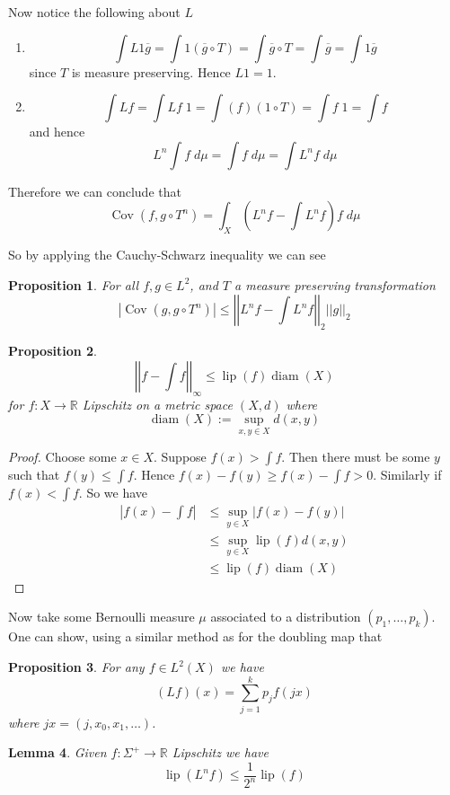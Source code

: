 \documentclass[11pt]{article}
\newcommand{\defeq}{:=}
\newcommand{\abs}[1]{\left|#1\right|}
\newcommand{\norm}[1]{\left|\left|#1\right|\right|}
\newcommand{\R}{\mathbb{R}}
\DeclareMathOperator{\Cov}{\mathrm{Cov}}
\DeclareMathOperator{\lip}{\mathrm{lip}}
\DeclareMathOperator{\diam}{\mathrm{diam}}
\newcommand{\dm}{\;d\mu}
\newtheorem{prop}{Proposition}[section]
\newtheorem{lemma}[prop]{Lemma}
\begin{document}
Now notice the following about $L$
\begin{enumerate}
	\item \[
			\int L 1 \overline{g} = \int 1 \left( \overline{g}\circ T\right) = \int \overline{g}\circ T = \int \overline{g} = \int 1\overline{g}
		\]
		since $T$ is measure preserving.
		Hence $L1 = 1$.
	\item \[
			\int Lf = \int Lf \; 1 = \int (f)(1 \circ T) = \int f\; 1 = \int f
		\]
		and hence
		\[
L^n\int f \dm = \int f \dm = \int L^n f \dm
		\]
\end{enumerate}
Therefore we can conclude that
\[
	\Cov (f, g \circ T^n) = \int_X\left( L^n f - \int L^n f \right)f \dm
\]

So by applying the Cauchy-Schwarz inequality we can see
\begin{prop}
For all $f, g\in L^2$, and $T$ a measure preserving transformation
\[
	\abs{\Cov(g, g \circ T^n)} \leq \norm{L^n f - \int L^n f}_2 \norm{g}_2
\]
\end{prop}

\begin{prop}
\[
	\norm{f - \int f}_\infty \leq \lip(f) \diam(X)
\]
for $f: X \to \R$ Lipschitz on a metric space $(X, d)$ where
\[
	\diam(X) \defeq \sup_{x, y \in X} d(x, y)
\]
\end{prop}

\begin{proof}
Choose some $x\in X$.
Suppose $f(x) > \int f$.
Then there must be some $y$ such that $f(y) \leq \int f$.
Hence $f(x) - f(y) \geq f(x) - \int f > 0$.
Similarly if $f(x) < \int f$.
So we have
\begin{align*}
	\abs{f(x) - \int f} & \leq \sup_{y\in X} \abs{f(x) - f(y)} \\
						& \leq \sup_{y\in X} \lip(f) d(x, y) \\
						& \leq \lip(f) \diam(X)
\end{align*}
\end{proof}

Now take some Bernoulli measure $\mu$ associated to a distribution $(p_1, \dots , p_k)$.
One can show, using a similar method as for the doubling map that
\begin{prop}
For any $f\in L^2(X)$ we have
\[
	(Lf)(x)= \sum_{j=1}^{k}p_j f(jx)
\]
where $jx = (j, x_0, x_1, \dots )$.
\end{prop}

\begin{lemma}
Given $f:\Sigma^+ \to \R$ Lipschitz we have
\[
	\lip(L^n f) \leq \frac{1}{2^n}\lip(f)
\]
\end{lemma}
\end{document}
